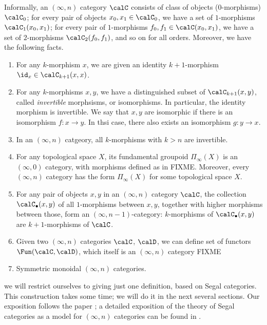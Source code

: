Informally, an $(\infty, n)$ category $\calC$ consists of class of  objects
(0-morphisms) $\calC_0$; for every pair of objects $x_0, x_1\in \calC_0$, we
have a set of $1$-morphisms $\calC_1(x_0, x_1)$; for every pair of
$1$-morphisms $f_0, f_1\in \calC(x_0,x_1)$, we have a set of $2$-morphisms
$\calC_2(f_0,f_1)$, and so on for all orders. Moreover, we have the following
facts.

\begin{enumerate}
  \item For any $k$-morphism $x$, we are given an identity  $k+1$-morphism
    $\id_x \in \calC_{k+1}(x,x)$.
  \item For any $k$-morphisms $x,y$, we have a distinguished subset of
    $\calC_{k+1}(x,y)$, called \emph{invertible} morphsisms, or isomorphisms. In
    particular, the identity morphism is invertible. We say that $x,y$ are
    isomorphic if there is an isomorphism $f\colon x\to y$. In thsi case, there
    also exists an isomorphism $g\colon y\to x$.
  \item In an $(\infty, n)$ catgeory, all $k$-morphisms with $k>n$ are
    invertible.
  \item For any topological space $X$, its fundamental groupoid $\Pi_\infty(X)$
    is an $(\infty, 0)$ category, with morphisms defined as in FIXME. Moreover,
    every $(\infty, n)$ category has the form $\Pi_\infty(X)$ for some
    topological space $X$.
  \item For any pair of objects $x,y$ in an $(\infty, n)$ category   $\calC$,
    the collection $\calC_\bullet(x,y)$ of all $1$-morphisms between $x,y$,
    together with higher morphisms between those, form an $(\infty,
    n-1)$-category: $k$-morphisms of $\calC_\bullet(x,y)$ are $k+1$-morphisms
    of $\calC$.
  \item Given two $(\infty, n)$ categories $\calC$, $\calD$, we can define
    set of functors $\Fun(\calC, \calD)$, which itself is an $(\infty, n)$
    category FIXME
  \item Symmetric monoidal $(\infty, n)$ categories.
\end{enumerate}


 we will
restrict ourselves to giving just one definition, based on Segal categories.
This construction takes some time; we will do it in the next several sections.
Our exposition follows the paper \cite{schommer-pries-category}; a detailed
exposition of the theory of Segal categories as a model for $(\infty, n)$
categories can be found in \cite{simpson}.





